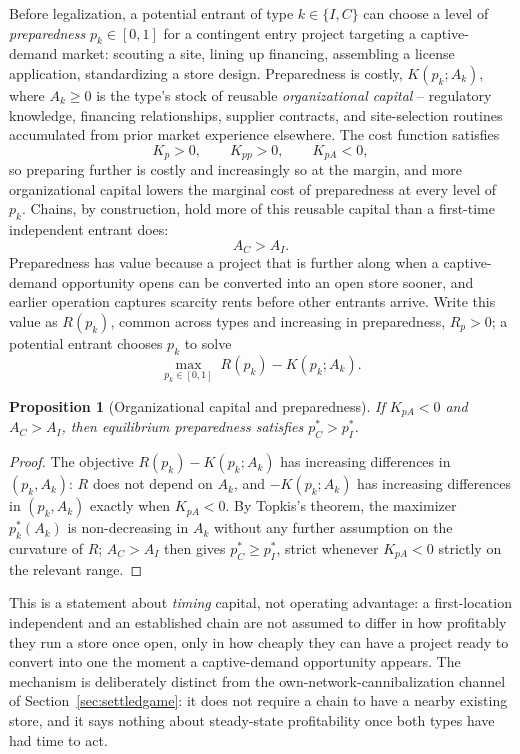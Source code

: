 \documentclass[english,12pt]{article}
\newtheorem{proposition}{Proposition}
\begin{document}
Before legalization, a potential entrant of type $k\in\{I,C\}$ can choose a level of \emph{preparedness} $p_k\in[0,1]$ for a contingent entry project targeting a captive-demand market: scouting a site, lining up financing, assembling a license application, standardizing a store design. Preparedness is costly, $K(p_k;A_k)$, where $A_k\ge0$ is the type's stock of reusable \emph{organizational capital} -- regulatory knowledge, financing relationships, supplier contracts, and site-selection routines accumulated from prior market experience elsewhere. The cost function satisfies
\[
K_p>0, \qquad K_{pp}>0, \qquad K_{pA}<0,
\]
so preparing further is costly and increasingly so at the margin, and more organizational capital lowers the marginal cost of preparedness at every level of $p_k$. Chains, by construction, hold more of this reusable capital than a first-time independent entrant does:
\[
A_C>A_I.
\]
Preparedness has value because a project that is further along when a captive-demand opportunity opens can be converted into an open store sooner, and earlier operation captures scarcity rents before other entrants arrive. Write this value as $R(p_k)$, common across types and increasing in preparedness, $R_p>0$; a potential entrant chooses $p_k$ to solve
\[
\max_{p_k\in[0,1]} \; R(p_k) - K(p_k;A_k).
\]

\begin{proposition}[Organizational capital and preparedness]
\label{prop:preparedness}
If $K_{pA}<0$ and $A_C>A_I$, then equilibrium preparedness satisfies $p_C^*>p_I^*$.
\end{proposition}
\begin{proof}
The objective $R(p_k)-K(p_k;A_k)$ has increasing differences in $(p_k,A_k)$: $R$ does not depend on $A_k$, and $-K(p_k;A_k)$ has increasing differences in $(p_k,A_k)$ exactly when $K_{pA}<0$. By Topkis's theorem, the maximizer $p_k^*(A_k)$ is non-decreasing in $A_k$ without any further assumption on the curvature of $R$; $A_C>A_I$ then gives $p_C^*\ge p_I^*$, strict whenever $K_{pA}<0$ strictly on the relevant range.
\end{proof}

This is a statement about \emph{timing} capital, not operating advantage: a first-location independent and an established chain are not assumed to differ in how profitably they run a store once open, only in how cheaply they can have a project ready to convert into one the moment a captive-demand opportunity appears. The mechanism is deliberately distinct from the own-network-cannibalization channel of Section~\ref{sec:settledgame}: it does not require a chain to have a nearby existing store, and it says nothing about steady-state profitability once both types have had time to act.
\end{document}
